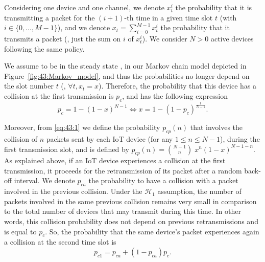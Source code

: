 Considering one device and one channel,
we denote $x_t^i$ the probability that it is transmitting a packet for the $(i+1)$-th time in a given time slot $t$ (with $i\in \{0, \dots, M-1 \}$),
and we denote $x_t = \sum_{i=0}^{M-1}x_t^i$ the probability that it transmits a packet (\ie, just the sum on $i$ of $x_t^i$).
We consider $N > 0$ active devices following the same policy.

%

We assume to be in the steady state \cite{Norris98}, in our Markov chain model depicted in Figure~\ref{fig:43:Markov_model}, and thus the probabilities no longer depend on the slot number $t$ (\ie, $\forall t, x_t=x$).
Therefore, the probability that this device has a collision at the first transmission is $p_c$, and has the following expression
%
\begin{equation}\label{eq:43:1}
	p_c = 1-\left(1-x\right)^{N-1} \iff x = 1-\left(1-p_c\right)^{\frac{1}{N-1}}.
\end{equation}

Moreover, from \eqref{eq:43:1} we define the probability $p_{cp}(n)$ that involves the collision of $n$ packets sent by each IoT device (for any $1\leq n \leq N-1$), during the first transmission slot, and is defined by $p_{cp}(n) = {N-1 \choose n} \; x^n \left(1-x\right)^{N-1-n}$.
%
As explained above, if an IoT device experiences a collision at the first transmission, it proceeds for the retransmission of its packet after a random back-off interval.
We denote $p_{ca}$ the probability to have a collision with a packet involved in the previous collision.
Under the $\mathcal{H}_{1}$ assumption, the number of packets involved in the same previous collision remains very small in comparison to the total number of devices that may transmit during this time. In other words, this collision probability does not depend on previous retransmissions and is equal to $p_c$.
So, the probability that the same device's packet experiences again a collision at the second time slot is
%
\begin{equation}\label{eq:43:decomppc1}
	p_{c1} = p_{ca}+\left(1-p_{ca} \right)p_c.
\end{equation}


